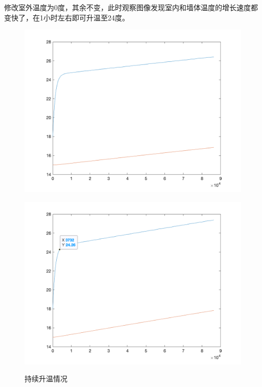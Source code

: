 \documentclass[withoutpreface,bwprint]{cumcmthesis} %
\begin{document}
修改室外温度为0度，其余不变，此时观察图像发现室内和墙体温度的增长速度都变快了，在1小时左右即可升温至24度。
\begin{figure}[h]
    \centering
    \begin{minipage}[c]{0.45\textwidth}
        \includegraphics[width=1\textwidth]{figures/1-3-1.png}
    \label{fig:my_label}
    \end{minipage}
\begin{minipage}[c]{0.45\textwidth}
    \includegraphics[width=1\textwidth]{figures/1-3-2.png}
    \label{fig:my_label}
\end{minipage}
\caption{持续升温情况}
\end{figure}
\end{document}
